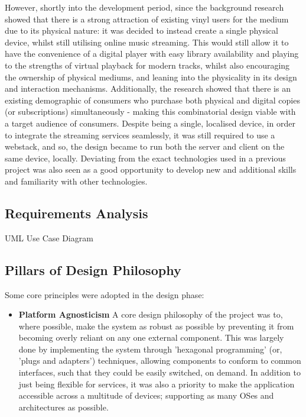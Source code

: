         However, shortly into the development period, since the background research showed that there is a strong attraction of existing vinyl users for the medium due to its physical nature: it was decided to instead create a single physical device, whilst still utilising online music streaming. This would still allow it to have the convenience of a digital player with easy library availability and playing to the strengths of virtual playback for modern tracks, whilst also encouraging the ownership of physical mediums, and leaning into the physicality in its design and interaction mechanisms. Additionally, the research showed that there is an existing demographic of consumers who purchase both physical and digital copies (or subscriptions) simultaneously - making this combinatorial design viable with a target audience of consumers. Despite being a single, localised device, in order to integrate the streaming services seamlessly, it was still required to use a webstack, and so, the design became to run both the server and client on the same device, locally. Deviating from the exact technologies used in a previous project was also seen as a good opportunity to develop new and additional skills and familiarity with other technologies.
        
        \subsection{Requirements Analysis}
    
            \begin{temp}
                UML Use Case Diagram
            \end{temp}
    
        \subsection{Pillars of Design Philosophy}
    
            Some core principles were adopted in the design phase:
    
            \begin{itemize}
                \item \textbf{Platform Agnosticism} A core design philosophy of the project was to, where possible, make the system as robust as possible by preventing it from becoming overly reliant on any one external component. This was largely done by implementing the system through 'hexagonal programming' (or, 'plugs and adapters') techniques, allowing components to conform to common interfaces, such that they could be easily switched, on demand. In addition to just being flexible for services, it was also a priority to make the application accessible across a multitude of devices; supporting as many OSes and architectures as possible.
            \end{itemize}
    
